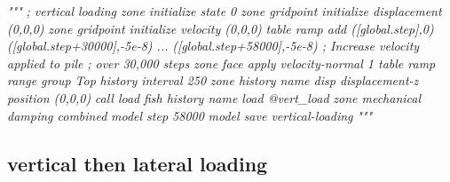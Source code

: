 \documentclass[a4paper, nobind]{templates/ociamthesis}
\newenvironment{Shaded}{\begin{snugshade}}{\end{snugshade}}
\newcommand{\CommentTok}[1]{\textcolor[rgb]{0.56,0.35,0.01}{\textit{#1}}}
\renewenvironment{Shaded}
{
  \vspace{10pt}%
  \begin{snugshade}%
}{%
  \end{snugshade}%
  \vspace{8pt}%
}
\begin{document}
\begin{Shaded}
\begin{Highlighting}[]
\CommentTok{"""}
\CommentTok{; vertical loading}
\CommentTok{zone initialize state 0}
\CommentTok{zone gridpoint initialize displacement (0,0,0)}
\CommentTok{zone gridpoint initialize velocity     (0,0,0) }
\CommentTok{table \textquotesingle{}ramp\textquotesingle{} add ([global.step],0) ([global.step+30000],{-}5e{-}8) ...}
\CommentTok{      ([global.step+58000],{-}5e{-}8) ; Increase velocity applied to pile}
\CommentTok{                                  ; over 30,000 steps}
\CommentTok{zone face apply velocity{-}normal 1 table \textquotesingle{}ramp\textquotesingle{} range group \textquotesingle{}Top\textquotesingle{}}
\CommentTok{history interval 250}
\CommentTok{zone history name \textquotesingle{}disp\textquotesingle{} displacement{-}z position (0,0,0)}
\CommentTok{call \textquotesingle{}load\textquotesingle{}}
\CommentTok{fish history name \textquotesingle{}load\textquotesingle{} @vert\_load}
\CommentTok{zone mechanical damping combined}
\CommentTok{model step 58000}
\CommentTok{model save \textquotesingle{}vertical{-}loading\textquotesingle{}}
\CommentTok{"""}
\end{Highlighting}
\end{Shaded}

\hypertarget{vertical-then-lateral-loading}{%
\subsection{vertical then lateral loading}\label{vertical-then-lateral-loading}}
\end{document}
